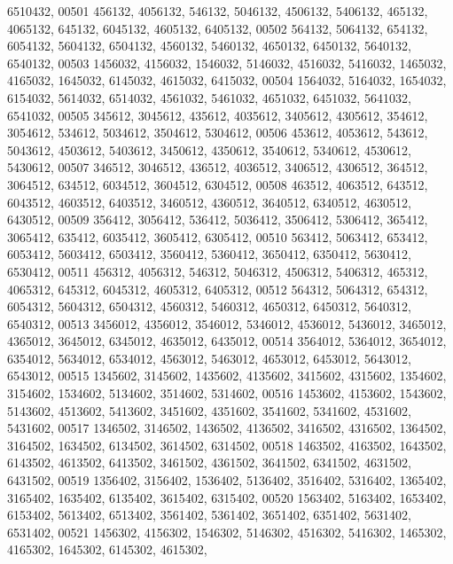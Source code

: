 \begin{DoxyCode}
      6510432,
00501        456132, 4056132,  546132, 5046132, 4506132, 5406132,  465132, 4065132,  645132, 6045132, 4605132, 
      6405132,
00502        564132, 5064132,  654132, 6054132, 5604132, 6504132, 4560132, 5460132, 4650132, 6450132, 5640132, 
      6540132,
00503       1456032, 4156032, 1546032, 5146032, 4516032, 5416032, 1465032, 4165032, 1645032, 6145032, 4615032, 
      6415032,
00504       1564032, 5164032, 1654032, 6154032, 5614032, 6514032, 4561032, 5461032, 4651032, 6451032, 5641032, 
      6541032,
00505        345612, 3045612,  435612, 4035612, 3405612, 4305612,  354612, 3054612,  534612, 5034612, 3504612, 
      5304612,
00506        453612, 4053612,  543612, 5043612, 4503612, 5403612, 3450612, 4350612, 3540612, 5340612, 4530612, 
      5430612,
00507        346512, 3046512,  436512, 4036512, 3406512, 4306512,  364512, 3064512,  634512, 6034512, 3604512, 
      6304512,
00508        463512, 4063512,  643512, 6043512, 4603512, 6403512, 3460512, 4360512, 3640512, 6340512, 4630512, 
      6430512,
00509        356412, 3056412,  536412, 5036412, 3506412, 5306412,  365412, 3065412,  635412, 6035412, 3605412, 
      6305412,
00510        563412, 5063412,  653412, 6053412, 5603412, 6503412, 3560412, 5360412, 3650412, 6350412, 5630412, 
      6530412,
00511        456312, 4056312,  546312, 5046312, 4506312, 5406312,  465312, 4065312,  645312, 6045312, 4605312, 
      6405312,
00512        564312, 5064312,  654312, 6054312, 5604312, 6504312, 4560312, 5460312, 4650312, 6450312, 5640312, 
      6540312,
00513       3456012, 4356012, 3546012, 5346012, 4536012, 5436012, 3465012, 4365012, 3645012, 6345012, 4635012, 
      6435012,
00514       3564012, 5364012, 3654012, 6354012, 5634012, 6534012, 4563012, 5463012, 4653012, 6453012, 5643012, 
      6543012,
00515       1345602, 3145602, 1435602, 4135602, 3415602, 4315602, 1354602, 3154602, 1534602, 5134602, 3514602, 
      5314602,
00516       1453602, 4153602, 1543602, 5143602, 4513602, 5413602, 3451602, 4351602, 3541602, 5341602, 4531602, 
      5431602,
00517       1346502, 3146502, 1436502, 4136502, 3416502, 4316502, 1364502, 3164502, 1634502, 6134502, 3614502, 
      6314502,
00518       1463502, 4163502, 1643502, 6143502, 4613502, 6413502, 3461502, 4361502, 3641502, 6341502, 4631502, 
      6431502,
00519       1356402, 3156402, 1536402, 5136402, 3516402, 5316402, 1365402, 3165402, 1635402, 6135402, 3615402, 
      6315402,
00520       1563402, 5163402, 1653402, 6153402, 5613402, 6513402, 3561402, 5361402, 3651402, 6351402, 5631402, 
      6531402,
00521       1456302, 4156302, 1546302, 5146302, 4516302, 5416302, 1465302, 4165302, 1645302, 6145302, 4615302, 

\end{DoxyCode}
